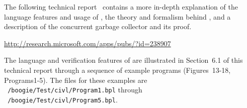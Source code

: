 The following technical report~\cite{gc-techreport} contains a more in-depth explanation of the language features and usage of \civl, the theory and formalism behind \civl, and a description of the concurrent garbage collector and its proof. 

\vspace*{0.3cm}
{\url{http://research.microsoft.com/apps/pubs/?id=238907}}
\vspace*{0.3cm}

The language and verification features of \civl are illustrated in Section~6.1 of this technical report through a sequence of example programs (Figures~13-18, Programs1-5). The \civl files for these examples are {\tt ~/boogie/Test/civl/\-Program1.bpl} through {\tt ~/boogie/Test/civl/Program5.bpl}. 



